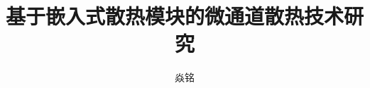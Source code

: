 \documentclass[promaster,eversion]{thesis-guet}
\title{基于嵌入式散热模块的微通道散热技术研究}{Research on microchannel heat dissipation technology \\& based on embedded heat dissipation module} %
\author{焱铭}
\begin{document}
    \makecover %

%     
%     
%     
%     


    
\end{document}
